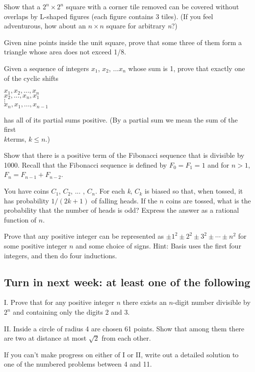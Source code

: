 \documentclass{article}
\begin{document}
Show that a \(2^n \times  2^n\) square with a corner tile removed can be covered without overlaps by L-shaped figures (each figure contains 3 tiles).
(If you feel adventurous, how about an \(n \times  n\) square for arbitrary \textit{ n}?)

Given nine points inside the unit square, prove that some three of them form a triangle whose area does not exceed 1/8.

Given a sequence of integers \(x_1\), \(x_2\), \(\text{...}x_n\) whose sum is 1, prove that exactly one of the cyclic shifts

 { }\(x_1,x_2,\text{...},x_n\)\\
 { }\(x_2,\text{...},x_n,x_1\)\\
\hspace*{3.5ex} $\vdots $\\
 { } { } { } \(x_n,x_1,\text{...},x_{n-1}\)

has all of its partial sums positive. (By a partial sum we mean the sum of the first\\
\(k\)terms, \(k \leq  n\).)

Show that there is a positive term of the Fibonacci sequence that is divisible by 1000. Recall that the Fibonacci { }sequence is defined by \(F_0=
F_1= 1\) and for \(n>1\), \(F_n= F_{n-1}+F_{n-2}\).

You have coins \(C_1\), \(C_2\), ... , \(C_n\). For each \textit{ k}, \(C_k\) is biased so that, when tossed, it has probability \(1/(2k + 1)\) of
falling heads. If the \(n\) coins are tossed, what is the probability that the number of heads is odd? Express the answer as a rational function
of \(n\).

Prove that any positive integer can be represented as \(\pm 1^2\pm 2^2\pm 3^2\pm \cdots \pm n^2\) for some positive integer \(n\) and some choice
of signs. { }Hint: { }Basis uses the first four integers, and then do four inductions.

\subsection*{Turn in next week: at least one of the following}

I. { }Prove that for any positive integer \(n\) there exists an \(n\)-digit number divisible by \(2^n\) and containing only the digits 2 and 3.

II. { }Inside a circle of radius 4 are chosen 61 points. Show that among them there are two at distance at most \(\sqrt{2}\) from each other.

If you can{'}t make progress on either of I or II, write out a detailed solution to one of the numbered problems between 4 and 11.
\end{document}
